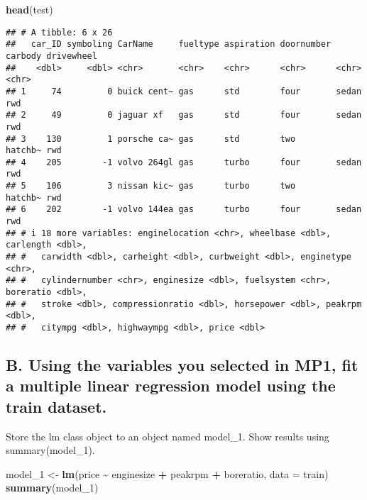 \documentclass[
]{article}
\newenvironment{Shaded}{\begin{snugshade}}{\end{snugshade}}
\newcommand{\AttributeTok}[1]{\textcolor[rgb]{0.13,0.29,0.53}{#1}}
\newcommand{\FunctionTok}[1]{\textcolor[rgb]{0.13,0.29,0.53}{\textbf{#1}}}
\newcommand{\NormalTok}[1]{#1}
\newcommand{\OtherTok}[1]{\textcolor[rgb]{0.56,0.35,0.01}{#1}}
\newcommand{\SpecialCharTok}[1]{\textcolor[rgb]{0.81,0.36,0.00}{\textbf{#1}}}
\begin{document}
\begin{Shaded}
\begin{Highlighting}[]
\FunctionTok{head}\NormalTok{(test)}
\end{Highlighting}
\end{Shaded}

\begin{verbatim}
## # A tibble: 6 x 26
##   car_ID symboling CarName     fueltype aspiration doornumber carbody drivewheel
##    <dbl>     <dbl> <chr>       <chr>    <chr>      <chr>      <chr>   <chr>     
## 1     74         0 buick cent~ gas      std        four       sedan   rwd       
## 2     49         0 jaguar xf   gas      std        four       sedan   rwd       
## 3    130         1 porsche ca~ gas      std        two        hatchb~ rwd       
## 4    205        -1 volvo 264gl gas      turbo      four       sedan   rwd       
## 5    106         3 nissan kic~ gas      turbo      two        hatchb~ rwd       
## 6    202        -1 volvo 144ea gas      turbo      four       sedan   rwd       
## # i 18 more variables: enginelocation <chr>, wheelbase <dbl>, carlength <dbl>,
## #   carwidth <dbl>, carheight <dbl>, curbweight <dbl>, enginetype <chr>,
## #   cylindernumber <chr>, enginesize <dbl>, fuelsystem <chr>, boreratio <dbl>,
## #   stroke <dbl>, compressionratio <dbl>, horsepower <dbl>, peakrpm <dbl>,
## #   citympg <dbl>, highwaympg <dbl>, price <dbl>
\end{verbatim}

\subsection{B. Using the variables you selected in MP1, fit a multiple
linear regression model using the train
dataset.}\label{b.-using-the-variables-you-selected-in-mp1-fit-a-multiple-linear-regression-model-using-the-train-dataset.}

Store the lm class object to an object named model\_1. Show results
using summary(model\_1).

\begin{Shaded}
\begin{Highlighting}[]
\NormalTok{model\_1 }\OtherTok{\textless{}{-}} \FunctionTok{lm}\NormalTok{(price }\SpecialCharTok{\textasciitilde{}}\NormalTok{ enginesize }\SpecialCharTok{+}\NormalTok{ peakrpm }\SpecialCharTok{+}\NormalTok{ boreratio, }\AttributeTok{data =}\NormalTok{ train)}
\FunctionTok{summary}\NormalTok{(model\_1)}
\end{Highlighting}
\end{Shaded}
\end{document}
